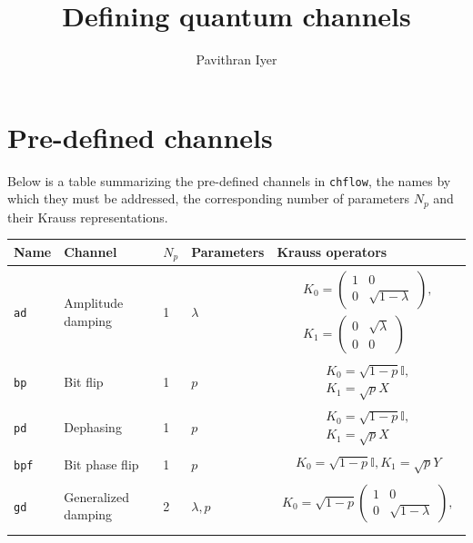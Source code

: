 \documentclass[11pt]{article}
\title{Defining quantum channels}
\author{Pavithran Iyer}
\def\bI{\mathbb{I}}
\begin{document}
\maketitle
\section{Pre-defined channels}
Below is a table summarizing the pre-defined channels in \texttt{chflow}, the names by which they must be addressed, the corresponding number of parameters $N_{p}$ and their Krauss representations.
\renewcommand{\arraystretch}{1.8}
\begin{longtable}{|p{1.2cm}|p{2.5cm}|p{1cm}|p{2cm}|p{8cm}|}
\hline
Name & Channel & $N_{p}$ & Parameters & Krauss operators \\
\hline
\texttt{ad} & Amplitude damping & 1 & $\lambda$ &
\parbox{5cm}{\begin{gather*}
K_{0} = \begin{pmatrix}1 & 0 \\ 0 & \sqrt{1 - \lambda}\end{pmatrix}, \\
K_{1} = \begin{pmatrix}0 & \sqrt{\lambda} \\ 0 & 0\end{pmatrix}
\end{gather*}}\\
\hline
\texttt{bp} & Bit flip & 1 & $p$ &
\parbox{5cm}{\begin{gather*}
K_{0} = \sqrt{1-p}\bI, \\
K_{1} = \sqrt{p}X
\end{gather*}} \\
\hline
\texttt{pd} & Dephasing & 1 & $p$ &
\parbox{5cm}{\begin{gather*}
K_{0} = \sqrt{1-p}\bI, \\
K_{1} = \sqrt{p}X
\end{gather*}} \\
\hline
\texttt{bpf} & Bit phase flip & 1 & $p$ &
\parbox{5cm}{\begin{gather}
K_{0} = \sqrt{1-p}\bI,
K_{1} = \sqrt{p}Y
\end{gather}} \\
\hline
\texttt{gd} & Generalized damping & 2 & $\lambda, p$ &
\parbox{5cm}{\begin{gather}
K_{0} = \sqrt{1-p}\begin{pmatrix}1 & 0 \\ 0 & \sqrt{1 - \lambda}\end{pmatrix}, \nonumber \\

\end{gather}}
\end{longtable}
\end{document}
